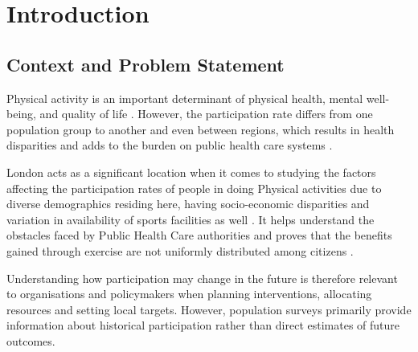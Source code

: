 \documentclass[ %
                    author={Ashrey Ashrey, Sanya Kapoor, Trisha Sharma, Yash Bhooshan Pandloskar},
                supervisor={Dr. Dalila O’Grady},
                    degree={MSc},
                     title={Using machine learning to forecast physical activity participation, volunteering and activity patterns in London},
                  subtitle={},
                      type={},
                      year={2021}]{dissertation}
\begin{document}
%

\mainmatter

\chapter{Introduction}
\label{chap:introduction}

\section{Context and Problem Statement}

Physical activity is an important determinant of physical health, mental well-being, and quality of life \cite{who_physical_activity_2024}. However, the participation rate differs from one population group to another and even between regions, which results in health disparities and adds to the burden on public health care systems \cite{who_physical_activity_2024}.

London acts as a significant location when it comes to studying the factors affecting the participation rates of people in doing Physical activities due to diverse demographics residing here, having socio-economic disparities and variation in availability of sports facilities as well \cite{sport_england_active_lives,brainard_etal_2019}. It helps understand the obstacles faced by Public Health Care authorities and proves that the benefits gained through exercise are not uniformly distributed among citizens \cite{brainard_etal_2019,brinkley_etal_2024}.

Understanding how participation may change in the future is therefore relevant to organisations and policymakers when planning interventions, allocating resources and setting local targets. However, population surveys primarily provide information about historical participation rather than direct estimates of future outcomes.
\end{document}
